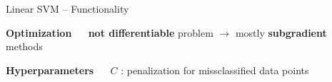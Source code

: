 \documentclass[11pt,compress,t,notes=noshow, xcolor=table]{beamer}
\newcommand{\highlight}[1]{\textcolor{highlightcol}{\textbf{#1}}}
\begin{document}
\begin{frame}{Linear SVM -- Functionality}
\medskip

\highlight{Optimization} ~~
\textbf{not differentiable} problem $\rightarrow$ mostly \textbf{subgradient} methods 

\medskip

\highlight{Hyperparameters} ~~ \textbf{$C$} : penalization for missclassified data points 


\medskip

\end{frame}

\end{document}
